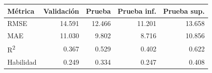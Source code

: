 \begin{tabular}{lrrrr}
\toprule
Métrica & Validación & Prueba & Prueba inf. & Prueba sup. \\
\midrule
RMSE & 14.591 & 12.466 & 11.201 & 13.658 \\
MAE & 11.030 & 9.802 & 8.716 & 10.856 \\
R\textsuperscript{2} & 0.367 & 0.529 & 0.402 & 0.622 \\
Habilidad & 0.249 & 0.334 & 0.247 & 0.408 \\
\bottomrule
\end{tabular}
